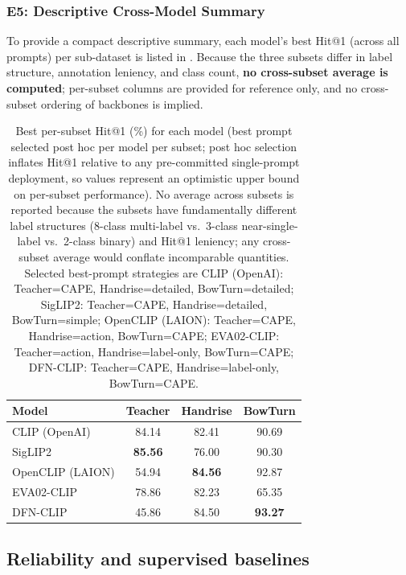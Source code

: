 \documentclass[symmetry,article,submit,pdftex,moreauthors]{Definitions/mdpi}
\begin{document}
\subsubsection{E5: Descriptive Cross-Model Summary}
\label{sec:e5}

To provide a compact descriptive summary, each model's best Hit@1 (across all prompts) per sub-dataset is listed in . Because the three subsets differ in label structure, annotation leniency, and class count, \textbf{no cross-subset average is computed}; per-subset columns are provided for reference only, and no cross-subset ordering of backbones is implied.

\begin{table}[H]
\caption{Best per-subset Hit@1 (\%) for each model (best prompt selected post hoc per model per subset; post hoc selection inflates Hit@1 relative to any pre-committed single-prompt deployment, so values represent an optimistic upper bound on per-subset performance). No average across subsets is reported because the subsets have fundamentally different label structures (8-class multi-label vs.\ 3-class near-single-label vs.\ 2-class binary) and Hit@1 leniency; any cross-subset average would conflate incomparable quantities. Selected best-prompt strategies are CLIP (OpenAI): Teacher=CAPE, Handrise=detailed, BowTurn=detailed; SigLIP2: Teacher=CAPE, Handrise=detailed, BowTurn=simple; OpenCLIP (LAION): Teacher=CAPE, Handrise=action, BowTurn=CAPE; EVA02-CLIP: Teacher=action, Handrise=label-only, BowTurn=CAPE; DFN-CLIP: Teacher=CAPE, Handrise=label-only, BowTurn=CAPE.}
\label{tab:model_ranking}
\centering
\begin{tabular}{lccc}
\toprule
\textbf{Model} & \textbf{Teacher} & \textbf{Handrise} & \textbf{BowTurn} \\
\midrule
CLIP (OpenAI) & 84.14 & 82.41 & 90.69 \\
SigLIP2 & \textbf{85.56} & 76.00 & 90.30 \\
OpenCLIP (LAION) & 54.94 & \textbf{84.56} & 92.87 \\
EVA02-CLIP & 78.86 & 82.23 & 65.35 \\
DFN-CLIP & 45.86 & 84.50 & \textbf{93.27} \\
\bottomrule
\end{tabular}
\end{table}

\subsection{Reliability and supervised baselines}
\end{document}

